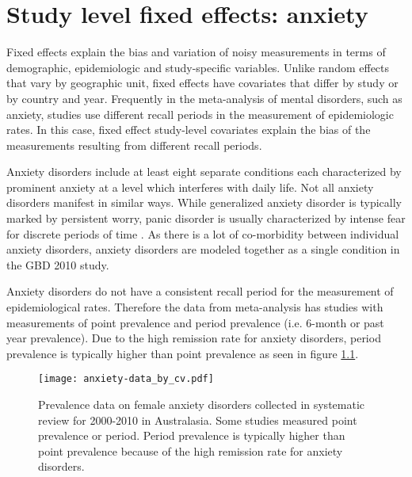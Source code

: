 \chapter{Study level fixed effects: anxiety}
\label{applications-efx_study_level}

Fixed effects explain the bias and variation of noisy measurements in terms of demographic, epidemiologic and study-specific variables.  Unlike random effects that vary by geographic unit, fixed effects have covariates that differ by study or by country and year.  Frequently in the meta-analysis of mental disorders, such as anxiety, studies use different recall periods in the measurement of epidemiologic rates.  In this case, fixed effect study-level covariates explain the bias of the measurements resulting from different recall periods.

Anxiety disorders include at least eight separate conditions each characterized by prominent anxiety at a level which interferes with daily life.  Not all anxiety disorders manifest in similar ways.  While generalized anxiety disorder is typically marked by persistent worry, panic disorder is usually characterized by intense fear for discrete periods of time \cite{american_diagnostic_2000}.  As there is a lot of co-morbidity between individual anxiety disorders, anxiety disorders are modeled together as a single condition in the GBD 2010 study.

Anxiety disorders do not have a consistent recall period for the measurement of epidemiological rates.  Therefore the data from meta-analysis has studies with measurements of point prevalence and period prevalence (i.e. 6-month or past year prevalence).  Due to the high remission rate for anxiety disorders, period prevalence is typically higher than point prevalence as seen in figure \ref{fig:app-anxiety data}.

    \begin{figure}[h]
        \begin{center}
            \texttt{[image: anxiety-data\_by\_cv.pdf]}
            \caption{Prevalence data on female anxiety disorders collected in systematic review for 2000-2010 in Australasia.  Some studies measured point prevalence or period.  Period prevalence is typically higher than point prevalence because of the high remission rate for anxiety disorders.}
            \label{fig:app-anxiety data}
        \end{center}
    \end{figure}

